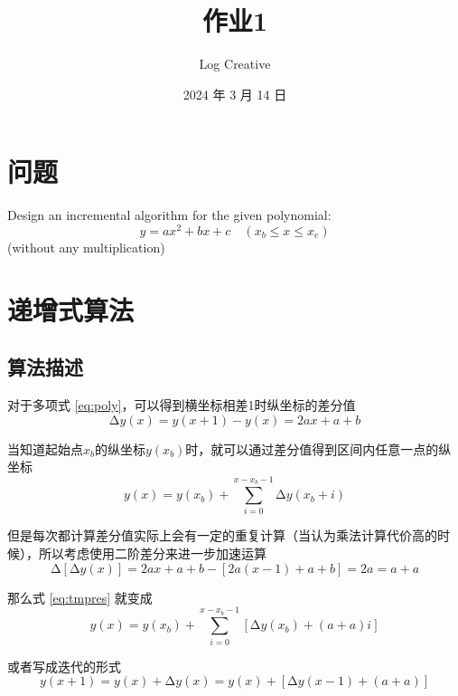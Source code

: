 \documentclass[math-font=newcm]{sjtuarticle}
\title{作业1}
\author{Log Creative}
\date{2024 年 3 月 14 日}
\begin{document}
\maketitle

\tableofcontents*
\clearpage

\section{问题}

Design an incremental algorithm for the given polynomial:
\begin{equation}\label{eq:poly}
    y=ax^2+bx+c\quad(x_b\leq x\leq x_e)
\end{equation}
(without any multiplication)

\section{递增式算法}

\subsection{算法描述}

对于多项式 \eqref{eq:poly}，可以得到横坐标相差1时纵坐标的差分值
\begin{equation}
    \increment y(x)=y(x+1)-y(x)=2ax+a+b
\end{equation}

当知道起始点$x_b$的纵坐标$y(x_b)$时，就可以通过差分值得到区间内任意一点的纵坐标
\begin{equation}\label{eq:tmpres}
    y(x)=y(x_b)+\sum_{i=0}^{x-x_b-1}\increment y(x_b+i)
\end{equation}

但是每次都计算差分值实际上会有一定的重复计算（当认为乘法计算代价高的时候），所以考虑使用二阶差分来进一步加速运算
\begin{equation}
    \increment[\increment y(x)]=2ax+a+b-[2a(x-1)+a+b]=2a=a+a
\end{equation}

那么式 \eqref{eq:tmpres} 就变成
\begin{equation}\label{eq:res}
    y(x)=y(x_b)+\sum_{i=0}^{x-x_b-1}[\increment y(x_b)+(a+a)i]
\end{equation}

或者写成迭代的形式
\begin{equation}
    y(x+1)=y(x)+\increment y(x)=y(x)+[\increment y(x-1)+(a+a)]
\end{equation}
\end{document}
